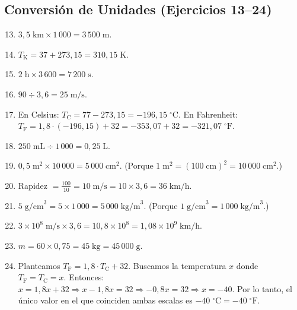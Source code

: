 \documentclass[12pt, a4paper]{article}
\begin{document}
\subsection*{Conversión de Unidades (Ejercicios 13--24)}

\begin{enumerate}[leftmargin=*, label=\textbf{\arabic*.}]
  \setcounter{enumi}{12}
  \item $3{,}5\;\text{km} \times 1\,000 = 3\,500\;\text{m}$.

  \item $T_{\text{K}} = 37 + 273{,}15 = 310{,}15\;\text{K}$.

  \item $2\;\text{h} \times 3\,600 = 7\,200\;\text{s}$.

  \item $90 \div 3{,}6 = 25\;\text{m/s}$.

  \item En Celsius: $T_{\text{C}} = 77 - 273{,}15 = -196{,}15\;^\circ\text{C}$. En Fahrenheit: $T_{\text{F}} = 1{,}8 \cdot (-196{,}15) + 32 = -353{,}07 + 32 = -321{,}07\;^\circ\text{F}$.

  \item $250\;\text{mL} \div 1\,000 = 0{,}25\;\text{L}$.

  \item $0{,}5\;\text{m}^2 \times 10\,000 = 5\,000\;\text{cm}^2$. (Porque $1\;\text{m}^2 = (100\;\text{cm})^2 = 10\,000\;\text{cm}^2$.)

  \item Rapidez $= \frac{100}{10} = 10\;\text{m/s} = 10 \times 3{,}6 = 36\;\text{km/h}$.

  \item $5\;\text{g/cm}^3 = 5 \times 1\,000 = 5\,000\;\text{kg/m}^3$. (Porque $1\;\text{g/cm}^3 = 1\,000\;\text{kg/m}^3$.)

  \item $3 \times 10^8\;\text{m/s} \times 3{,}6 = 10{,}8 \times 10^8 = 1{,}08 \times 10^9\;\text{km/h}$.

  \item $m = 60 \times 0{,}75 = 45\;\text{kg} = 45\,000\;\text{g}$.

  \item Planteamos $T_{\text{F}} = 1{,}8 \cdot T_{\text{C}} + 32$. Buscamos la temperatura $x$ donde $T_{\text{F}} = T_{\text{C}} = x$. Entonces: $x = 1{,}8x + 32 \Rightarrow x - 1{,}8x = 32 \Rightarrow -0{,}8x = 32 \Rightarrow x = -40$. Por lo tanto, el único valor en el que coinciden ambas escalas es $-40\;^\circ\text{C} = -40\;^\circ\text{F}$.
\end{enumerate}
\end{document}
